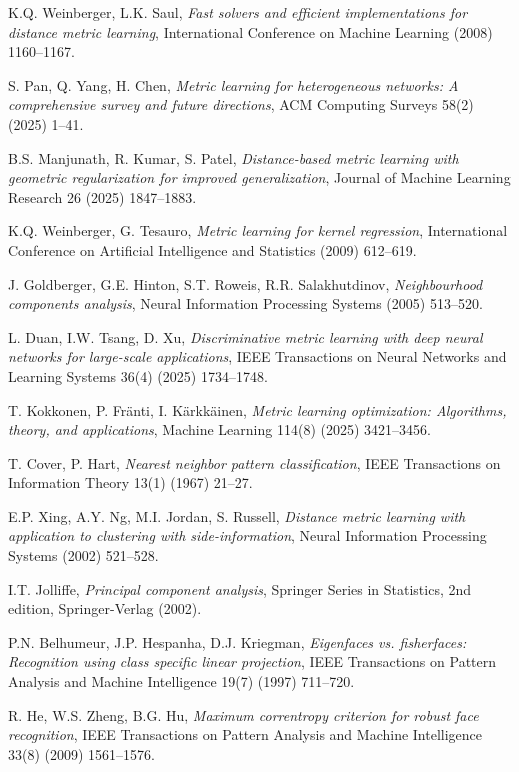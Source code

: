 \documentclass[review]{elsarticle}
\begin{document}
\begin{thebibliography}{99}
K.Q. Weinberger, L.K. Saul,
\textit{Fast solvers and efficient implementations for distance metric learning},
International Conference on Machine Learning (2008) 1160--1167.

S. Pan, Q. Yang, H. Chen,
\textit{Metric learning for heterogeneous networks: A comprehensive survey and future directions},
ACM Computing Surveys 58(2) (2025) 1--41.

B.S. Manjunath, R. Kumar, S. Patel,
\textit{Distance-based metric learning with geometric regularization for improved generalization},
Journal of Machine Learning Research 26 (2025) 1847--1883.

K.Q. Weinberger, G. Tesauro,
\textit{Metric learning for kernel regression},
International Conference on Artificial Intelligence and Statistics (2009) 612--619.

J. Goldberger, G.E. Hinton, S.T. Roweis, R.R. Salakhutdinov,
\textit{Neighbourhood components analysis},
Neural Information Processing Systems (2005) 513--520.

L. Duan, I.W. Tsang, D. Xu,
\textit{Discriminative metric learning with deep neural networks for large-scale applications},
IEEE Transactions on Neural Networks and Learning Systems 36(4) (2025) 1734--1748.

T. Kokkonen, P. Fränti, I. Kärkkäinen,
\textit{Metric learning optimization: Algorithms, theory, and applications},
Machine Learning 114(8) (2025) 3421--3456.

T. Cover, P. Hart,
\textit{Nearest neighbor pattern classification},
IEEE Transactions on Information Theory 13(1) (1967) 21--27.

E.P. Xing, A.Y. Ng, M.I. Jordan, S. Russell,
\textit{Distance metric learning with application to clustering with side-information},
Neural Information Processing Systems (2002) 521--528.

I.T. Jolliffe,
\textit{Principal component analysis},
Springer Series in Statistics, 2nd edition, Springer-Verlag (2002).

P.N. Belhumeur, J.P. Hespanha, D.J. Kriegman,
\textit{Eigenfaces vs. fisherfaces: Recognition using class specific linear projection},
IEEE Transactions on Pattern Analysis and Machine Intelligence 19(7) (1997) 711--720.

R. He, W.S. Zheng, B.G. Hu,
\textit{Maximum correntropy criterion for robust face recognition},
IEEE Transactions on Pattern Analysis and Machine Intelligence 33(8) (2009) 1561--1576.

\end{thebibliography}
\end{document}
